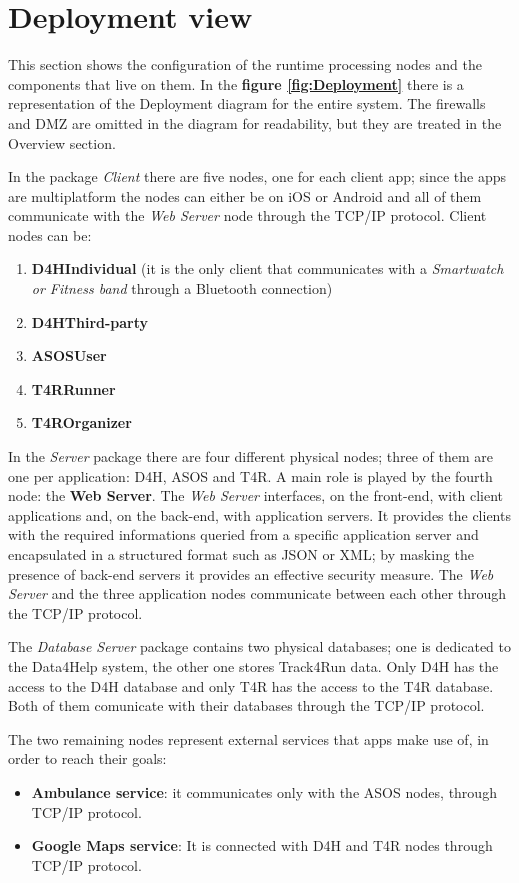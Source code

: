 \section{Deployment view}

This section shows the configuration of the runtime processing nodes and the components that live on them. In the \textbf{figure \ref{fig:Deployment}} there is a representation of the Deployment diagram for the entire system.
The firewalls and DMZ are omitted in the diagram for readability, but they are treated in the Overview section.

In the package \emph{Client} there are five nodes, one for each client app; since the apps are multiplatform the nodes can either be on iOS or Android and all of them communicate with the \emph{Web Server} node through the TCP/IP protocol. 
Client nodes can be:
\begin{enumerate}
    \item \textbf{D4HIndividual} (it is the only client that communicates with a \emph{Smartwatch or Fitness band} through a Bluetooth connection)
    \item \textbf{D4HThird-party}
    \item \textbf{ASOSUser}
    \item \textbf{T4RRunner}
    \item \textbf{T4ROrganizer}
\end{enumerate}

In the \emph{Server} package there are four different physical nodes; three of them are one per application: D4H, ASOS and T4R. A main role is played by the fourth node: the \textbf{Web Server}. The \emph{Web Server} interfaces, on the front-end, with client applications and, on the back-end, with application servers. It provides the clients with the required informations queried from a specific application server and encapsulated in a structured format such as JSON or XML; by masking the presence of back-end servers it provides an effective security measure.
The \emph{Web Server} and the three application nodes communicate between each other through the TCP/IP protocol.

The \emph{Database Server} package contains two physical databases; one is dedicated to the Data4Help system, the other one stores Track4Run data. Only D4H has the access to the D4H database and only T4R has the access to the T4R database. Both of them comunicate with their databases through the TCP/IP protocol.

The two remaining nodes represent external services that apps make use of, in order to reach their goals:
\begin{itemize}
    \item \textbf{Ambulance service}: it communicates only with the ASOS nodes, through TCP/IP protocol. 
    \item \textbf{Google Maps service}: It is connected with D4H and T4R nodes through TCP/IP protocol.
\end{itemize}


